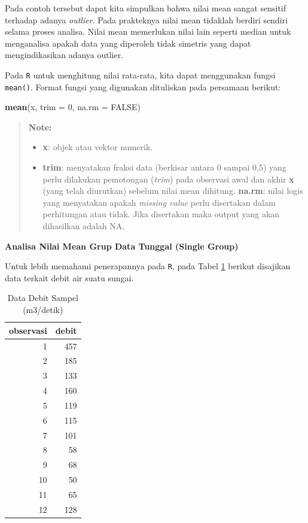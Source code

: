 \documentclass[]{book}
\newenvironment{Shaded}{\begin{snugshade}}{\end{snugshade}}
\newcommand{\KeywordTok}[1]{\textcolor[rgb]{0.13,0.29,0.53}{\textbf{#1}}}
\newcommand{\DataTypeTok}[1]{\textcolor[rgb]{0.13,0.29,0.53}{#1}}
\newcommand{\DecValTok}[1]{\textcolor[rgb]{0.00,0.00,0.81}{#1}}
\newcommand{\OtherTok}[1]{\textcolor[rgb]{0.56,0.35,0.01}{#1}}
\newcommand{\NormalTok}[1]{#1}
\providecommand{\tightlist}{%
  \setlength{\itemsep}{0pt}\setlength{\parskip}{0pt}}
\begin{document}
Pada contoh tersebut dapat kita simpulkan bahwa nilai mean sangat
sensitif terhadap adanya \emph{outlier}. Pada prakteknya nilai mean
tidaklah berdiri sendiri selama proses analisa. Nilai mean memerlukan
nilai lain seperti median untuk menganalisa apakah data yang diperoleh
tidak simetris yang dapat mengindikasikan adanya outlier.

Pada \texttt{R} untuk menghitung nilai rata-rata, kita dapat menggunakan
fungsi \texttt{mean()}. Format fungsi yang digunakan dituliskan pada
persamaan berikut:

\begin{Shaded}
\begin{Highlighting}[]
\KeywordTok{mean}\NormalTok{(x, }\DataTypeTok{trim =} \DecValTok{0}\NormalTok{, }\DataTypeTok{na.rm =} \OtherTok{FALSE}\NormalTok{)}
\end{Highlighting}
\end{Shaded}

\begin{quote}
\textbf{Note:}

\begin{itemize}
\tightlist
\item
  \textbf{x}: objek atau vektor numerik.
\item
  \textbf{trim}: menyatakan fraksi data (berkisar antara 0 sampai 0,5)
  yang perlu dilakukan pemotongan (\emph{trim}) pada observasi awal dan
  akhir \textbf{x} (yang telah diurutkan) sebelum nilai mean dihitung.
  \textbf{na.rm}: nilai logis yang menyatakan apakah \emph{missing
  value} perlu disertakan dalam perhitungan atau tidak. Jika disertakan
  maka output yang akan dihasilkan adalah NA.
\end{itemize}
\end{quote}

\textbf{Analisa Nilai Mean Grup Data Tunggal (Single Group)}

Untuk lebih memahami penerapannya pada \texttt{R}, pada Tabel
\ref{tab:debitsungai} berikut disajikan data terkait debit air suatu
sungai.

\begin{table}[t]

\caption{\label{tab:debitsungai}Data Debit Sampel (m3/detik)}
\centering
\begin{tabular}{r|r}
\hline
observasi & debit\\
\hline
1 & 457\\
\hline
2 & 185\\
\hline
3 & 133\\
\hline
4 & 160\\
\hline
5 & 119\\
\hline
6 & 115\\
\hline
7 & 101\\
\hline
8 & 58\\
\hline
9 & 68\\
\hline
10 & 50\\
\hline
11 & 65\\
\hline
12 & 128\\
\hline
\end{tabular}
\end{table}
\end{document}
